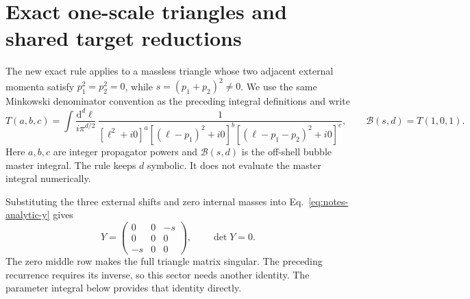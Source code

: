 \section{Exact one-scale triangles and shared target reductions}
\label{app:notes-analytic-batch}

The new exact rule applies to a massless triangle whose two adjacent external momenta satisfy
\(p_1^2=p_2^2=0\), while \(s=(p_1+p_2)^2\ne0\). We use the same Minkowski denominator convention as the preceding integral definitions and write
\begin{equation}
 T(a,b,c)=\int\frac{\mathrm d^d\ell}{i\pi^{d/2}}\,
 \frac{1}{[\ell^2+i0]^a[(\ell-p_1)^2+i0]^b
 [(\ell-p_1-p_2)^2+i0]^c},
 \qquad \mathcal B(s,d)=T(1,0,1).
 \label{eq:notes-batch-triangle-definition}
\end{equation}
Here \(a,b,c\) are integer propagator powers and \(\mathcal B(s,d)\) is the off-shell bubble master integral. The rule keeps \(d\) symbolic. It does not evaluate the master integral numerically.

Substituting the three external shifts and zero internal masses into Eq.~\eqref{eq:notes-analytic-y} gives
\begin{equation}
 Y=\begin{pmatrix}0&0&-s\\0&0&0\\-s&0&0\end{pmatrix},
 \qquad \det Y=0.
 \label{eq:notes-batch-triangle-matrix}
\end{equation}
The zero middle row makes the full triangle matrix singular. The preceding recurrence requires its inverse, so this sector needs another identity. The parameter integral below provides that identity directly.

